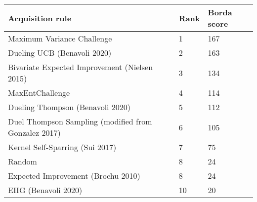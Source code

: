 \begin{tabular}{lll}
Acquisition rule & Rank & Borda score \\ 
\hline 
Maximum Variance Challenge & 1 & 167 \\ 
Dueling UCB (Benavoli 2020) & 2 & 163 \\ 
Bivariate Expected Improvement (Nielsen 2015) & 3 & 134 \\ 
MaxEntChallenge & 4 & 114 \\ 
Dueling Thompson (Benavoli 2020) & 5 & 112 \\ 
Duel Thompson Sampling (modified from Gonzalez 2017) & 6 & 105 \\ 
Kernel Self-Sparring (Sui 2017) & 7 & 75 \\ 
Random & 8 & 24 \\ 
Expected Improvement (Brochu 2010) & 8 & 24 \\ 
EIIG (Benavoli 2020) & 10 & 20 \\ 
\hline 
\end{tabular}